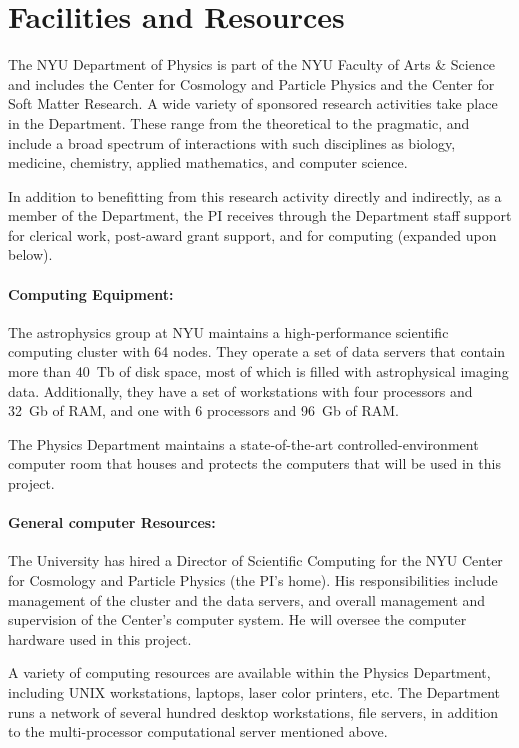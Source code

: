 \documentclass[letterpaper,12pt]{article}
\begin{document}
\section*{Facilities and Resources}

The NYU Department of Physics is part of the NYU Faculty of Arts \&
Science and includes the Center for Cosmology and Particle Physics and
the Center for Soft Matter Research.  A wide variety of sponsored
research activities take place in the Department.  These range from
the theoretical to the pragmatic, and include a broad spectrum of
interactions with such disciplines as biology, medicine, chemistry,
applied mathematics, and computer science.

In addition to benefitting from this research activity directly and
indirectly, as a member of the Department, the PI receives through the
Department staff support for clerical work, post-award grant support,
and for computing (expanded upon below).

\paragraph{Computing Equipment:}

The astrophysics group at NYU maintains a high-performance scientific
computing cluster with 64 nodes.  They operate a set of data servers
that contain more than 40~Tb of disk space, most of which is filled
with astrophysical imaging data.  Additionally, they have a set of
workstations with four processors and 32~Gb of RAM, and one with 6
processors and 96~Gb of RAM.

The Physics Department maintains a state-of-the-art
controlled-environment computer room that houses and protects the
computers that will be used in this project.

\paragraph{General computer Resources:}

The University has hired a Director of Scientific Computing for the
NYU Center for Cosmology and Particle Physics (the PI's home).  His
responsibilities include management of the cluster and the data
servers, and overall management and supervision of the Center's
computer system.  He will oversee the computer hardware used in this
project.

A variety of computing resources are available within the Physics
Department, including UNIX workstations, laptops, laser color
printers, etc.  The Department runs a network of several hundred
desktop workstations, file servers, in addition to the multi-processor
computational server mentioned above.
\end{document}
